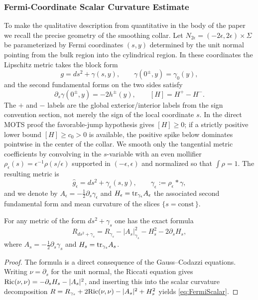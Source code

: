 \subsubsection{Fermi-Coordinate Scalar Curvature Estimate}
\label{sec:FermiScalar}

To make the qualitative description from  quantitative in the body of the paper we recall the precise geometry of the smoothing collar.  Let $N_{2\epsilon}=(-2\epsilon,2\epsilon)\times\Sigma$ be parameterized by Fermi coordinates $(s,y)$ determined by the unit normal pointing from the bulk region into the cylindrical region.  In these coordinates the Lipschitz metric takes the block form
\[
    g = ds^2 + \gamma(s,y), \qquad \gamma(0^\pm,y) = \gamma_0(y),
\]
and the second fundamental forms on the two sides satisfy
\[
    \partial_s \gamma(0^\pm,y) = -2 h^\pm(y), \qquad [H]=H^+-H^- .
\]
The \(+\) and \(-\) labels are the global exterior/interior labels from the sign convention section, not merely the sign of the local coordinate \(s\). In the direct MOTS proof the favorable-jump hypothesis gives \([H]\ge0\); if a strictly positive lower bound \([H]\ge c_0>0\) is available, the positive spike below dominates pointwise in the center of the collar.
We smooth only the tangential metric coefficients by convolving in the $s$-variable with an even mollifier $\rho_\epsilon(s)=\epsilon^{-1}\rho(s/\epsilon)$ supported in $(-\epsilon,\epsilon)$ and normalized so that $\int \rho = 1$.  The resulting metric is
\[
    \hat{g}_\epsilon = ds^2 + \gamma_\epsilon(s,y), \qquad \gamma_\epsilon := \rho_\epsilon * \gamma,
\]
and we denote by $A_\epsilon = -\tfrac12 \partial_s \gamma_\epsilon$ and $H_\epsilon=\mathrm{tr}_{\gamma_\epsilon} A_\epsilon$ the associated second fundamental form and mean curvature of the slices $\{s=\text{const}\,\}$.

\begin{lemma}\label{lem:FermiIdentity}
For any metric of the form $ds^2 + \gamma_s$ one has the exact formula
\begin{equation}\label{eq:FermiScalar}
    R_{ds^2 + \gamma_s} = R_{\gamma_s} - |A_s|^2_{\gamma_s} - H_s^2 - 2\partial_s H_s,
\end{equation}
where $A_s = -\tfrac12 \partial_s \gamma_s$ and $H_s = \mathrm{tr}_{\gamma_s} A_s$.
\end{lemma}

\begin{proof}
The formula is a direct consequence of the Gauss--Codazzi equations.  Writing $\nu = \partial_s$ for the unit normal, the Riccati equation gives $\mathrm{Ric}(\nu,\nu) = -\partial_s H_s - |A_s|^2$, and inserting this into the scalar curvature decomposition $R = R_{\gamma_s} + 2\mathrm{Ric}(\nu,\nu) - |A_s|^2 + H_s^2$ yields \eqref{eq:FermiScalar}.
\end{proof}

